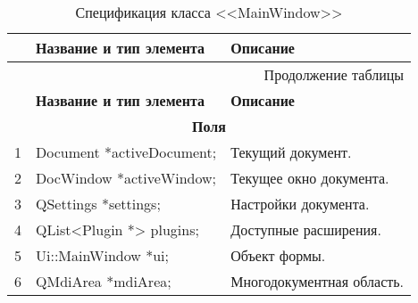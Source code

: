 \small
\singlespacing
\begin{longtable}[h]{|p{}|p{}|p{}|}
  \caption{Спецификация класса <<MainWindow>>}
	\\ \hline
	  \textbf{\No}                  &
	  \textbf{Название и тип элемента}  &
	  \textbf{Описание}
	\\ \hline
  \endfirsthead

  \multicolumn{3}{r}{Продолжение таблицы \thetable{}}
  \\ \hline
	  \textbf{\No}                  &
	  \textbf{Название и тип элемента}  &
	  \textbf{Описание}
	\\ \hline
  \endhead

  \multicolumn{3}{|c|}{\textbf{Поля}} \\
  \hline
  1 & Document *activeDocument; & Текущий документ. \\ \hline
  2 & DocWindow *activeWindow; & Текущее окно документа. \\ \hline
  3 & QSettings *settings; & Настройки документа. \\ \hline
  4 & QList<Plugin *> plugins; & Доступные расширения. \\ \hline
  5 & Ui::MainWindow *ui; & Объект формы. \\ \hline
  6 & QMdiArea *mdiArea; & Многодокументная область. \\ \hline


\end{longtable}
